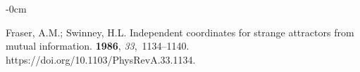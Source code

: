 \documentclass[entropy,article,accept,pdftex,moreauthors]{Definitions/mdpi}
\begin{document}
\begin{adjustwidth}{-\extralength}{0cm}
\begin{thebibliography}{999}
Fraser, A.M.; Swinney, H.L.
\newblock Independent coordinates for strange attractors from mutual
  information.
 {\bf 1986}, {\em 33},~1134--1140.
\newblock
  {https://doi.org/10.1103/PhysRevA.33.1134}.

\end{thebibliography}

\end{adjustwidth}
\end{document}
